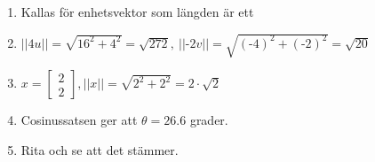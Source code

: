 \begin{enumerate}
\item Kallas för enhetsvektor som längden är ett
\item $||4u||=\sqrt{16^{2}+4^{2}}=\sqrt{272},\ ||\text{-}2v||=\sqrt{(\text{-}4)^{2}+(\text{-}2)^{2}}=\sqrt{20}$ 
\item $x = \begin{bmatrix} 2\\ 2 \end{bmatrix}, ||x||= \sqrt{2^{2}+2^{2}}=2\cdot\sqrt{2}$
\item Cosinussatsen ger att $\theta = 26.6$ grader.
\item Rita och se att det stämmer.
\end{enumerate}
